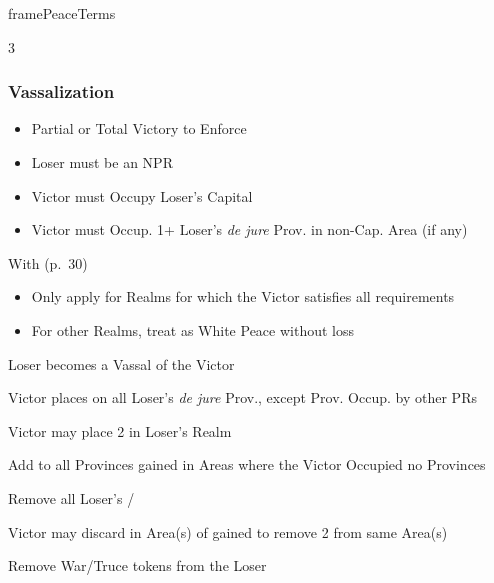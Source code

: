 \documentclass[10pt]{article}
\newlength{\fhPeaceTerms} \setlength\fhPeaceTerms{45.5\baselineskip}
\begin{document}
\begin{dynamiccontents*}{framePeaceTerms}
\begin{eubox}{\fhPeaceTerms}
\begin{multicols}{3}
		\subsubsection*{Vassalization }
		\begin{itemize}
			{
				\color{peaceReqColor}
				\item {}
				\begin{itemize}
					\item Partial or Total Victory to Enforce
					\item Loser must be an NPR
					\item Victor must Occupy Loser's Capital
					\item Victor must Occup. 1+ Loser's \emph{de jure} Prov. in non-Cap. Area (if any)
				\end{itemize}
			}
			\item With  (p.~30)
			\begin{itemize}
				\item Only apply for Realms for which the Victor satisfies all requirements
				\item For other Realms, treat as White Peace without \prestige loss
			\end{itemize}
			\item Loser becomes a Vassal of the Victor
			\item Victor places \vassalprovinces on all Loser's \emph{de jure} Prov., except Prov. Occup. by other PRs
			\item Victor may place 2 \influence in Loser's Realm
			\item Add \unrest to all Provinces gained in Areas where the Victor Occupied no Provinces
			\item Remove all Loser's \alliances/\marriages
			\item Victor may discard \claim in Area(s) of gained \vassalprovinces to remove 2 \unrest from same Area(s)
			\item Remove War/Truce tokens from the Loser
		\end{itemize}


\end{multicols}
\end{eubox}
\end{dynamiccontents*}
\end{document}
